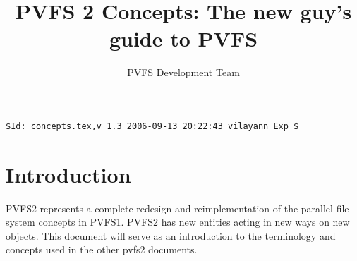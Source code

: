 \documentclass[10pt]{article} %
\title{PVFS 2 Concepts: The new guy's guide to PVFS}
\author{PVFS Development Team}
\begin{document}
\maketitle

\begin{verbatim}$Id: concepts.tex,v 1.3 2006-09-13 20:22:43 vilayann Exp $\end{verbatim}
\section{Introduction}

PVFS2 represents a complete redesign and reimplementation of the
parallel file system concepts in PVFS1.  PVFS2 has new entities acting
in new ways on new objects.  This document will serve as an introduction
to the terminology and concepts used in the other pvfs2 documents.

\end{document}
